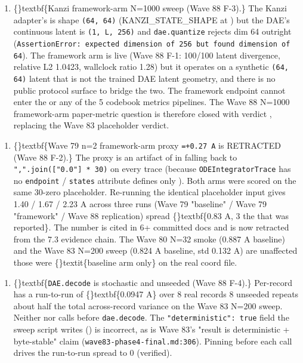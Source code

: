 \documentclass{article}
\begin{document}
\begin{enumerate}
\item \{\}textbf\{Kanzi framework-arm N=1000 sweep   (Wave 88 F-3).\} The Kanzi adapter's  is shape \texttt{(64, 64)} (KANZI\_STATE\_SHAPE at ) but the DAE's continuous latent is \texttt{(1, L, 256)} and \texttt{dae.quantize} rejects dim 64 outright (\texttt{AssertionError: expected dimension of 256 but found dimension of 64}). The framework arm is live (Wave 88 F-1: 100/100 latent divergence, relative L2 1.0423, wallclock ratio 1.28) but it operates on a synthetic \texttt{(64, 64)} latent that is not the trained DAE latent geometry, and there is no public protocol surface to bridge the two. The framework endpoint cannot enter the  or any of the 5 codebook metrics pipelines. The Wave 88 N=1000 framework-arm paper-metric question is therefore closed with verdict , replacing the Wave 83  placeholder verdict.
\end{enumerate}
\begin{enumerate}
\item \{\}textbf\{Wave 79 n=2 framework-arm proxy \texttt{=+0.27 A} is RETRACTED (Wave 88 F-2).\} The proxy is an artifact of  in  falling back to \texttt{",".join(["0.0"] * 30)} on every trace (because \texttt{ODEIntegratorTrace} has no \texttt{endpoint} / \texttt{states} attribute   defines only ). Both arms were scored on the same 30-zero placeholder. Re-running the identical placeholder input gives 1.40 / 1.67 / 2.23 A across three runs (Wave 79 "baseline" / Wave 79 "framework" / Wave 88 replication)  spread \{\}textbf\{0.83 A, 3 the  that was reported\}. The number is cited in 6+ committed docs and is now retracted from the 7.3 evidence chain. The Wave 80 N=32 smoke (0.887 A baseline) and the Wave 83 N=200 sweep (0.824 A baseline, std 0.132 A) are unaffected  those were \{\}textit\{baseline arm only\} on the real  coord file.
\end{enumerate}
\begin{enumerate}
\item \{\}textbf\{\texttt{DAE.decode} is stochastic and unseeded (Wave 88 F-4).\} Per-record  has a run-to-run  of \{\}textbf\{0.0947 A\} over 8 real records  8 unseeded repeats  about half the total across-record variance on the Wave 83 N=200 sweep. Neither  nor  calls  before \texttt{dae.decode}. The \texttt{"deterministic": true} field the sweep script writes () is incorrect, as is Wave 83's "result is deterministic + byte-stable" claim (\texttt{wave83-phase4-final.md:306}). Pinning  before each call drives the run-to-run spread to 0 (verified).
\end{enumerate}
\end{document}
